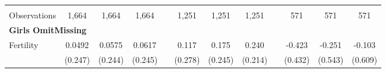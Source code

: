 \begin{landscape}
\begin{table}[htpb!]
\begin{center}
\begin{tabular}{lcccp{2mm}cccp{2mm}ccc}
\begin{footnotesize}\end{footnotesize}&\begin{footnotesize}\end{footnotesize}&\begin{footnotesize}\end{footnotesize}&\begin{footnotesize}\end{footnotesize}&\begin{footnotesize}\end{footnotesize}&\begin{footnotesize}\end{footnotesize}&\begin{footnotesize}\end{footnotesize}&\begin{footnotesize}\end{footnotesize}&\begin{footnotesize}\end{footnotesize}&\begin{footnotesize}\end{footnotesize}&\begin{footnotesize}\end{footnotesize}&\begin{footnotesize}\end{footnotesize}\\Observations&1,664&1,664&1,664&&1,251&1,251&1,251&&571&571&571\\
\multicolumn{12}{l}{\textbf{Girls OmitMissing}}\\ 
Fertility&0.0492&0.0575&0.0617&&0.117&0.175&0.240&&-0.423&-0.251&-0.103\\
&(0.247)&(0.244)&(0.245)&&(0.278)&(0.245)&(0.214)&&(0.432)&(0.543)&(0.609)\\

\end{tabular}
\end{center}
\end{table}
\end{landscape}
